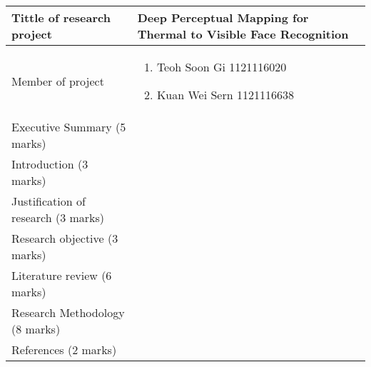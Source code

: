 \documentclass[a4paper, 12pt]{article}
\begin{document}
\begin{table}[h]
\begin{tabularx}{1.0\linewidth}{|l|X|}
\hline
Tittle of research project        & Deep Perceptual Mapping for Thermal to Visible Face Recognition \\

\hline

Member of project  &  \begin{enumerate}
  \item Teoh Soon Gi 1121116020
  \item Kuan Wei Sern 1121116638
\end{enumerate}\\

\hline

Executive Summary (5 marks) & \\

\hline

Introduction  (3 marks) & \\
\hline
Justification of research (3 marks)& \\
\hline
Research objective (3 marks)& \\
\hline
Literature review  (6 marks)& \\
\hline
Research Methodology  (8 marks)& \\
\hline
References (2 marks)& \\
\hline

\end{tabularx}
\end{table}
\end{document}
